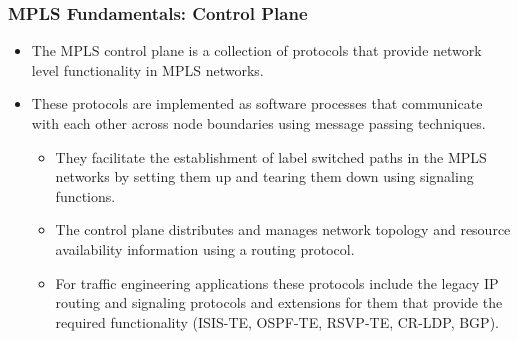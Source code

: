 \documentclass[12pt]{beamer}
\begin{document}
\begin{frame}
  \frametitle{MPLS Fundamentals: Control Plane}
  \begin{itemize}
    \item The MPLS control plane is a collection of protocols that provide network level functionality in MPLS networks.
    \item These protocols are implemented as software processes that communicate with each other across node boundaries using message passing techniques.
    \begin{itemize}
      \item They facilitate the establishment of label switched paths in the MPLS networks by setting them up and tearing them down using signaling functions.
      \item The control plane distributes and manages network topology and resource availability information using a routing protocol.
      \item For traffic engineering applications these protocols include the legacy IP routing and signaling protocols and extensions for them that provide the required functionality (ISIS-TE, OSPF-TE, RSVP-TE, CR-LDP, BGP).
    \end{itemize}
  \end{itemize}
\end{frame}
\end{document}
